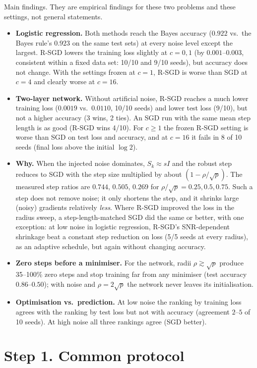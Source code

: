 \documentclass[11pt,a4paper]{article}
\begin{document}
Main findings. They are empirical findings for these two problems and these settings, not
general statements.
\begin{itemize}
\item \textbf{Logistic regression.} Both methods reach the Bayes accuracy
($0.922$ vs.\ the Bayes rule's $0.923$ on the same test sets) at every noise level except the
largest. R-SGD lowers the training loss slightly at $c=0,1$ (by $0.001$--$0.003$, consistent
within a fixed data set: 10/10 and 9/10 seeds), but accuracy does not change. With the settings
frozen at $c=1$, R-SGD is worse than SGD at $c=4$ and clearly worse at $c=16$.
\item \textbf{Two-layer network.} Without artificial noise, R-SGD reaches a much lower
training loss ($0.0019$ vs.\ $0.0110$, 10/10 seeds) and lower test loss (9/10), but not a
higher accuracy (3 wins, 2 ties). An SGD run with the same mean step length is as good
(R-SGD wins 4/10). For $c\ge1$ the frozen R-SGD setting is worse than SGD on test loss and
accuracy, and at $c=16$ it fails in 8 of 10 seeds (final loss above the initial
$\log 2$).
\item \textbf{Why.} When the injected noise dominates, $S_k\approx sI$ and the robust step
reduces to SGD with the step size multiplied by about $(1-\rho/\sqrt p)$. The measured step
ratios are $0.744$, $0.505$, $0.269$ for $\rho/\sqrt p=0.25,0.5,0.75$. Such a step does not
remove noise; it only shortens the step, and it shrinks large (noisy) gradients relatively
\emph{less}. Where R-SGD improved the loss in the radius sweep, a step-length-matched SGD
did the same or better, with one exception: at low noise in logistic regression, R-SGD's
SNR-dependent shrinkage beat a constant step reduction on loss (5/5 seeds at every radius), as an
adaptive schedule, but again without changing accuracy.
\item \textbf{Zero steps before a minimiser.} For the network, radii
$\rho\gtrsim\sqrt p$ produce 35--100\% zero steps and stop training far from any minimiser
(test accuracy $0.86$--$0.50$); with noise and $\rho=2\sqrt p$ the network never leaves its
initialisation.
\item \textbf{Optimisation vs.\ prediction.} At low noise the ranking by training loss agrees
with the ranking by test loss but not with accuracy (agreement $2$--$5$ of 10 seeds). At high
noise all three rankings agree (SGD better).
\end{itemize}

\section*{Step 1. Common protocol}
\end{document}
